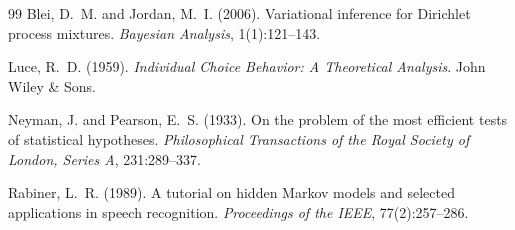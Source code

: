 \documentclass[11pt,a4paper]{article}
\begin{document}
\begin{thebibliography}{99}
Blei, D.~M. and Jordan, M.~I. (2006).
\newblock Variational inference for {D}irichlet process mixtures.
\newblock \emph{Bayesian Analysis}, 1(1):121--143.

Luce, R.~D. (1959).
\newblock \emph{Individual Choice Behavior: A Theoretical Analysis}.
\newblock John Wiley \& Sons.

Neyman, J. and Pearson, E.~S. (1933).
\newblock On the problem of the most efficient tests of statistical hypotheses.
\newblock \emph{Philosophical Transactions of the Royal Society of London,
Series A}, 231:289--337.

Rabiner, L.~R. (1989).
\newblock A tutorial on hidden {M}arkov models and selected applications in
speech recognition.
\newblock \emph{Proceedings of the IEEE}, 77(2):257--286.

\end{thebibliography}
\end{document}
